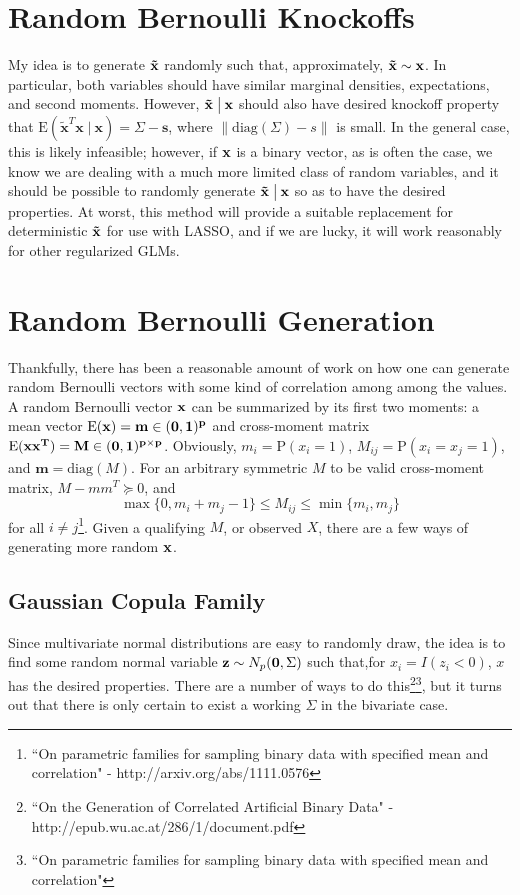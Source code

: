 \documentclass[11pt]{article}
\newcommand{\p}{\mathrm{P}}
\newcommand{\E}{\mathrm{E}}
\newcommand{\diag}{\mathrm{diag}}
\newcommand{\st}{ \; \big | \:}
\theoremstyle{definition}
\begin{document}
\section{Random Bernoulli Knockoffs}
    My idea is to generate $\bf \tilde x$ randomly such that, approximately, $\bf \tilde x\sim \bf x$. In particular, both variables should have similar marginal densities, expectations, and second moments. However, $\bf \tilde x\st \bf x$ should also have desired knockoff property that $\E(\mathbf{\tilde x}^T\mathbf x\st \mathbf x) = \Sigma-\mathbf s$, where $\|\diag(\Sigma)-s\|$ is small. In the general case, this is likely infeasible; however, if $\bf x$ is a binary vector, as is often the case, we know we are dealing with a much more limited class of random variables, and it should be possible to randomly generate $\bf \tilde x\st \bf x$ so as to have the desired properties. At worst, this method will provide a suitable replacement for deterministic $\bf \tilde x$ for use with LASSO, and if we are lucky, it will work reasonably for other regularized GLMs. 

\section{Random Bernoulli Generation}
    Thankfully, there has been a reasonable amount of work on how one can generate random Bernoulli vectors with some kind of correlation among among the values. A random Bernoulli vector $\bf x$ can be summarized by its first two moments: a mean vector $\E(\bf x)=m\in(0,1)^p$ and cross-moment matrix $\E(\bf x\bf x^T)=M\in(0,1)^{p\times p}$. Obviously, $m_i = \p(x_i=1)$, $M_{ij} = \p(x_i=x_j=1)$, and $\mathbf m=\diag(M)$. For an arbitrary symmetric $M$ to be valid cross-moment matrix, $M-mm^T\succeq0$, and
    \[ \max\{0,m_i+m_j -1\} \leq M_{ij} \leq \min\{m_i,m_j\}\]
    for all $i\neq j$\footnote{``On parametric families for sampling binary data with specified mean and correlation" - http://arxiv.org/abs/1111.0576}. Given a qualifying $M$, or observed $X$, there are a few ways of generating more random $\bf x$.

\subsection{Gaussian Copula Family}
    Since multivariate normal distributions are easy to randomly draw, the idea is to find some random normal variable $\mathbf z\sim N_p({\bf 0},\Sigma)$ such that,for $x_i = I(z_i<0)$, $x$ has the desired properties. There are a number of ways to do this\footnote{``On the Generation of Correlated Artificial Binary Data" - http://epub.wu.ac.at/286/1/document.pdf}\footnote{``On parametric families for sampling binary data with specified mean and correlation"}, but it turns out that there is only certain to exist a working $\Sigma$ in the bivariate case. 
\end{document}
